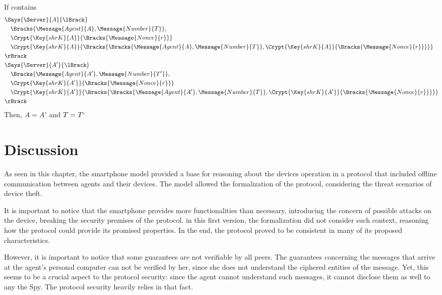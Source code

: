 \begin{theorem}
\label{thm:server-tan-unique}
  If  contains
  \begin{align*}
    & \Says{\Server}{A}{\lBrack} \\
      & \quad \Bracks{\Message{Agent}{A}, \Message{Number}{T}}, \\
      & \quad \Crypt{\Key{shrK}{A}}{\Bracks{\Message{Nonce}{r}}} \\
      & \quad \Crypt{\Key{shrK}{A}}{\Bracks{\Bracks{\Message{Agent}{A}, \Message{Number}{T}},\Crypt{\Key{shrK}{A}}{\Bracks{\Message{Nonce}{r}}}}} \\
    & \rBrack \\
    & \Says{\Server}{A'}{\lBrack} \\
      & \quad \Bracks{\Message{Agent}{A'}, \Message{Number}{T'}}, \\
      & \quad \Crypt{\Key{shrK}{A'}}{\Bracks{\Message{Nonce}{r}}} \\
      & \quad \Crypt{\Key{shrK}{A'}}{\Bracks{\Bracks{\Message{Agent}{A'}, \Message{Number}{T}},\Crypt{\Key{shrK}{A'}}{\Bracks{\Message{Nonce}{r}}}}} \\
    & \rBrack
  \end{align*}
  Then, $A = A'$ and $T = T`$
\end{theorem}


\section{Discussion}
As seen in this chapter, the smartphone model provided a base for reasoning about the devices operation in a protocol that included offline communication between agents and their devices. The model allowed the formalization of the protocol, considering the threat scenarios of device theft.

It is important to notice that the smartphone provides more functionalities than necessary, introducing the concern of possible attacks on the device, breaking the security premises of the protocol. in this first version, the formalization did not consider such context, reasoning how the protocol could provide its promised properties. In the end, the protocol proved to be consistent in many of its proposed characteristics.

However, it is important to notice that some guarantees are not verifiable by all peers. The guarantees concerning the messages that arrive at the agent's personal computer can not be verified by her, since she does not understand the ciphered entities of the message. Yet, this seems to be a crucial aspect to the protocol security: since the agent cannot understand such messages, it cannot disclose them as well to any the Spy. The protocol security heavily relies in that fact.
